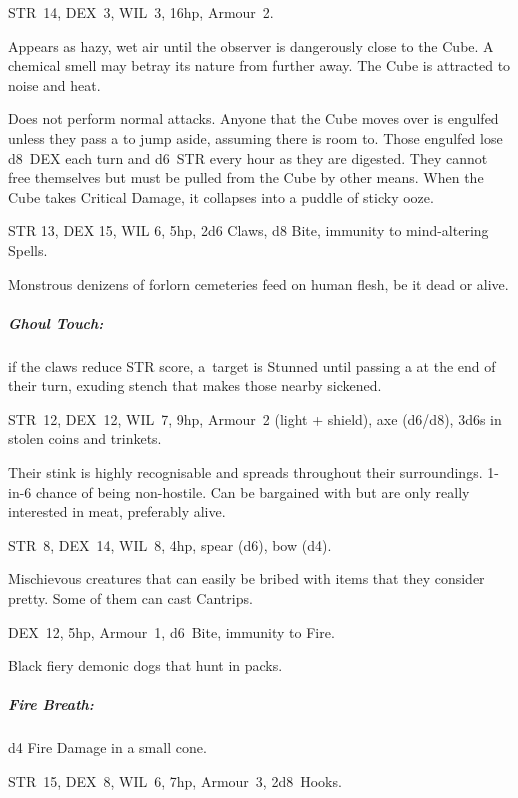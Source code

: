 \documentclass[itdr]{subfiles}
\begin{document}
\vfill

STR~14, DEX~3, WIL~3, 16hp, Armour~2.

Appears as hazy, wet air until the observer is dangerously close to the Cube. A chemical smell may betray its nature from further away. The Cube is
attracted to noise and heat.

Does not perform normal attacks. Anyone that the Cube moves over is engulfed unless they pass a  to jump aside, assuming there is room to. Those engulfed lose d8~DEX each turn and d6~STR every hour as they are digested. They cannot free themselves but must be pulled from the Cube by other means. When the Cube takes Critical Damage, it collapses into a puddle of sticky ooze.

\vfill

STR 13, DEX 15, WIL 6, 5hp, 2d6 Claws, d8 Bite, \mbox{immunity} to mind-altering Spells.

Monstrous denizens of forlorn cemeteries feed on human flesh, be it dead or alive.

\subparagraph{Ghoul Touch:} if the claws reduce STR score, \mbox{a target} is Stunned until passing a  at the end of their turn, exuding stench that makes those nearby sickened.

\vfill

STR~12, DEX~12, WIL~7, 9hp, Armour~2 (light + shield), axe (d6/d8), 3d6s in stolen coins and trinkets.

Their stink is highly recognisable and spreads throughout their surroundings.
1-in-6 chance of being non-hostile. Can be bargained with but are only really interested in meat, preferably alive.

\break

STR~8, DEX~14, WIL~8, 4hp, spear (d6), bow (d4).

Mischievous creatures that can easily be bribed with items that they consider pretty. Some of them can cast Cantrips.

\vfill

DEX~12, 5hp, Armour~1, d6~Bite, immunity to Fire.

Black fiery demonic dogs that hunt in packs.

\subparagraph{Fire Breath:} d4 Fire Damage in a small cone.

\vfill

STR~15, DEX~8, WIL~6, 7hp, Armour~3, 2d8~Hooks.
\end{document}
